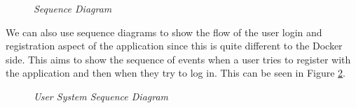 \begin{figure}[!ht]
\centering
{}
\caption{\em Sequence Diagram}
\label{fig:sequence_diagram}
\end{figure}

\newpage
We can also use sequence diagrams to show the flow of the user login and registration aspect of the application since this is quite different to the Docker side. This aims to show the sequence of events when a user tries to register with the application and then when they try to log in. This can be seen in Figure \ref{fig:user_sequence_diagram}.

\begin{figure}[!ht]
\centering
{}
\caption{\em User System Sequence Diagram}
\label{fig:user_sequence_diagram}
\end{figure}


